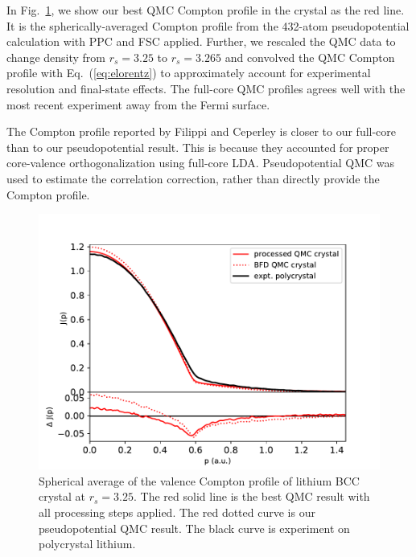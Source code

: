 In Fig.~\ref{fig:crystal-vcp}, we show our best QMC Compton profile in the crystal as the red line. It is the spherically-averaged Compton profile from the 432-atom pseudopotential calculation with PPC and FSC applied. Further, we rescaled the QMC data to change density from $r_s=3.25$ to $r_s=3.265$ and convolved the QMC Compton profile with Eq.~(\ref{eq:elorentz}) to approximately account for experimental resolution and final-state effects. The full-core QMC profiles agrees well with the most recent experiment away from the Fermi surface.

The Compton profile reported by Filippi and Ceperley \cite{Filippi1999} is closer to our full-core than to our pseudopotential result. This is because they accounted for proper core-valence orthogonalization using full-core LDA. Pseudopotential QMC was used to estimate the correlation correction, rather than directly provide the Compton profile.

\begin{figure}[h]
\centering
\includegraphics[width=0.8\linewidth]{li62g_crystal-jp}
\caption{Spherical average of the valence Compton profile of lithium BCC crystal at $r_s=3.25$. The red solid line is the best QMC result with all processing steps applied. The red dotted curve is our pseudopotential QMC result. The black curve is experiment on polycrystal lithium. \label{fig:crystal-vcp}}
\end{figure}

